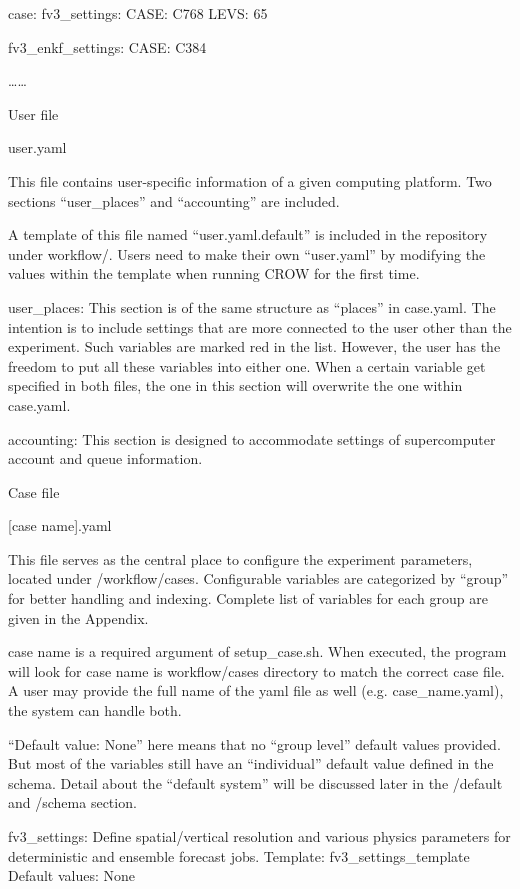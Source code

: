 case\-: fv3\-\_\-settings\-: C\-A\-S\-E\-: C768 L\-E\-V\-S\-: 65

fv3\-\_\-enkf\-\_\-settings\-: C\-A\-S\-E\-: C384

……

User file

user.\-yaml

This file contains user-\/specific information of a given computing platform. Two sections “user\-\_\-places” and “accounting” are included.

A template of this file named “user.\-yaml.\-default” is included in the repository under workflow/. Users need to make their own “user.\-yaml” by modifying the values within the template when running C\-R\-O\-W for the first time.

user\-\_\-places\-: This section is of the same structure as “places” in case.\-yaml. The intention is to include settings that are more connected to the user other than the experiment. Such variables are marked red in the list. However, the user has the freedom to put all these variables into either one. When a certain variable get specified in both files, the one in this section will overwrite the one within case.\-yaml.

accounting\-: This section is designed to accommodate settings of supercomputer account and queue information.

Case file

\mbox{[}case name\mbox{]}.yaml

This file serves as the central place to configure the experiment parameters, located under /workflow/cases. Configurable variables are categorized by “group” for better handling and indexing. Complete list of variables for each group are given in the Appendix.

case name is a required argument of setup\-\_\-case.\-sh. When executed, the program will look for case name is workflow/cases directory to match the correct case file. A user may provide the full name of the yaml file as well (e.\-g. case\-\_\-name.\-yaml), the system can handle both.

“\-Default value\-: None” here means that no “group level” default values provided. But most of the variables still have an “individual” default value defined in the schema. Detail about the “default system” will be discussed later in the /default and /schema section.

fv3\-\_\-settings\-: Define spatial/vertical resolution and various physics parameters for deterministic and ensemble forecast jobs. Template\-: fv3\-\_\-settings\-\_\-template Default values\-: None

